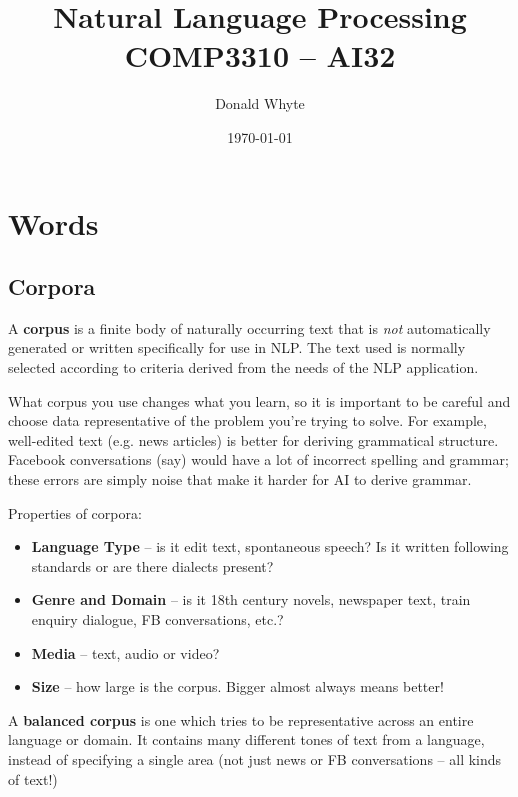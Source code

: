 \documentclass{article}
\title{Natural Language Processing \\ COMP3310 -- AI32}
\author{Donald Whyte}
\date{\today}
\begin{document}
\maketitle

\tableofcontents

\pagebreak
\listoffigures

\pagebreak
\listoftables

\pagebreak

\section{Words}

\subsection{Corpora}

A \textbf{corpus} is a finite body of naturally occurring text that is \textit{not} automatically generated or written specifically for use in NLP. The text used is normally selected according to criteria derived from the needs of the NLP application.

What corpus you use changes what you learn, so it is important to be careful and choose data representative of the problem you're trying to solve. For example, well-edited text (e.g. news articles) is better for deriving grammatical structure. Facebook conversations (say) would have a lot of incorrect spelling and grammar; these errors are simply noise that make it harder for AI to derive grammar.

Properties of corpora:
\begin{itemize}
	\item \textbf{Language Type} -- is it edit text, spontaneous speech? Is it written following standards or are there dialects present?
	\item \textbf{Genre and Domain} -- is it 18th century novels, newspaper text, train enquiry dialogue, FB conversations, etc.?
	\item \textbf{Media} -- text, audio or video?
	\item \textbf{Size} -- how large is the corpus. Bigger almost always means better!
\end{itemize}

A \textbf{balanced corpus} is one which tries to be representative across an entire language or domain. It contains many different tones of text from a language, instead of specifying a single area (not just news or FB conversations -- all kinds of text!)
\end{document}
